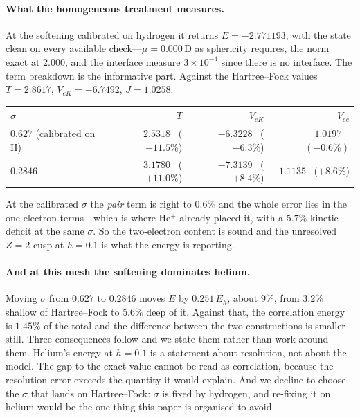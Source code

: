 \documentclass[11pt,a4paper]{article}
\begin{document}
\paragraph{What the homogeneous treatment measures.} At the softening calibrated on hydrogen it
returns $E = -2.771193$, with the state clean on every available check---$\mu = 0.000\,\mathrm{D}$
as sphericity requires, the norm exact at $2.000$, and the interface measure $3\times10^{-4}$ since
there is no interface. The term breakdown is the informative part. Against the Hartree--Fock values
$T = 2.8617$, $V_{eK} = -6.7492$, $J = 1.0258$:
\begin{center}
\begin{tabular}{lrrr}
\toprule
$\sigma$ & $T$ & $V_{eK}$ & $V_{ee}$ \\
\midrule
$0.627$ (calibrated on H) & $2.5318$ \ ($-11.5\%$) & $-6.3228$ \ ($-6.3\%$) & $\mathbf{1.0197}$ \ $(\mathbf{-0.6\%})$ \\
$0.2846$                  & $3.1780$ \ ($+11.0\%$) & $-7.3139$ \ ($+8.4\%$) & $1.1135$ \ ($+8.6\%$) \\
\bottomrule
\end{tabular}
\end{center}
At the calibrated $\sigma$ the \emph{pair} term is right to $0.6\%$ and the whole error lies in the
one-electron terms---which is where He$^+$ already placed it, with a $5.7\%$ kinetic deficit at the
same $\sigma$. So the two-electron content is sound and the unresolved $Z = 2$ cusp at $h = 0.1$ is
what the energy is reporting.

\paragraph{And at this mesh the softening dominates helium.} Moving $\sigma$ from $0.627$ to
$0.2846$ moves $E$ by $0.251\,E_h$, about $9\%$, from $3.2\%$ shallow of Hartree--Fock to $5.6\%$
deep of it. Against that, the correlation energy is $1.45\%$ of the total and the difference between
the two constructions is smaller still. Three consequences follow and we state them rather than
work around them. Helium's energy at $h = 0.1$ is a statement about resolution, not about the
model. The gap to the exact value cannot be read as correlation, because the resolution error
exceeds the quantity it would explain. And we decline to choose the $\sigma$ that lands on
Hartree--Fock: $\sigma$ is fixed by hydrogen, and re-fixing it on helium would be the one thing this
paper is organised to avoid.
\end{document}
